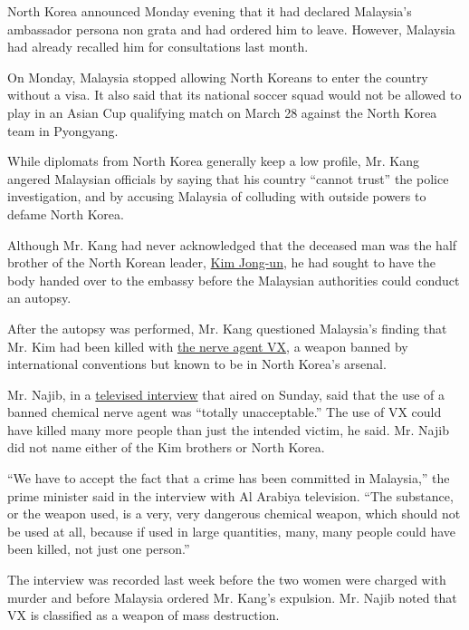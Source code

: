 North Korea announced Monday evening that it had declared Malaysia's
ambassador persona non grata and had ordered him to leave. However,
Malaysia had already recalled him for consultations last month.

On Monday, Malaysia stopped allowing North Koreans to enter the country
without a visa. It also said that its national soccer squad would not be
allowed to play in an Asian Cup qualifying match on March 28 against the
North Korea team in Pyongyang.

While diplomats from North Korea generally keep a low profile, Mr. Kang
angered Malaysian officials by saying that his country ``cannot trust''
the police investigation, and by accusing Malaysia of colluding with
outside powers to defame North Korea.

Although Mr. Kang had never acknowledged that the deceased man was the
half brother of the North Korean leader,
\href{https://www.nytimes.com/topic/person/kim-jongun?inline=nyt-per}{Kim
Jong-un}, he had sought to have the body handed over to the embassy
before the Malaysian authorities could conduct an autopsy.

After the autopsy was performed, Mr. Kang questioned Malaysia's finding
that Mr. Kim had been killed with
\href{https://www.nytimes.com/2017/02/24/world/asia/vx-nerve-agent-kim-jong-nam.html}{the
nerve agent VX}, a weapon banned by international conventions but known
to be in North Korea's arsenal.

Mr. Najib, in a
\href{http://english.alarabiya.net/en/News/gulf/2017/03/05/Malaysia-s-PM-Razak-Mutual-desire-for-security-cooperation-with-Saudi-Arabia.html}{televised
interview} that aired on Sunday, said that the use of a banned chemical
nerve agent was ``totally unacceptable.'' The use of VX could have
killed many more people than just the intended victim, he said. Mr.
Najib did not name either of the Kim brothers or North Korea.

``We have to accept the fact that a crime has been committed in
Malaysia,'' the prime minister said in the interview with Al Arabiya
television. ``The substance, or the weapon used, is a very, very
dangerous chemical weapon, which should not be used at all, because if
used in large quantities, many, many people could have been killed, not
just one person.''

The interview was recorded last week before the two women were charged
with murder and before Malaysia ordered Mr. Kang's expulsion. Mr. Najib
noted that VX is classified as a weapon of mass destruction.

